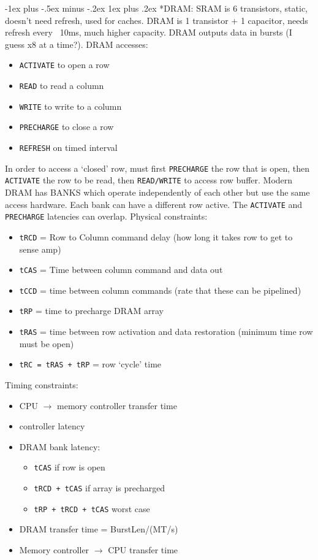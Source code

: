 \documentclass[landscape,10pt]{article}
\makeatletter
\renewcommand{\subsubsection}{\@startsection{subsubsection}{3}{0mm}%
            {-1ex plus -.5ex minus -.2ex}%
            {1ex plus .2ex}%
            {\normalfont\small\bfseries}}
\newcommand{\code}[1]{\texttt{#1}}
\makeatother
\begin{document}
\begin{multicols}{4}
\subsubsection*{DRAM:} SRAM is 6 transistors, static, doesn't need refresh, used for caches. DRAM is 1 transistor + 1 capacitor, needs refresh every ~10ms, much higher capacity. DRAM outputs data in bursts (I guess x8 at a time?). DRAM accesses:
\begin{itemize}
    \item[] \code{ACTIVATE} to open a row
    \item[] \code{READ} to read a column
    \item[] \code{WRITE} to write to a column
    \item[] \code{PRECHARGE} to close a row
    \item[] \code{REFRESH} on timed interval
\end{itemize}
In order to access a `closed' row, must first \code{PRECHARGE} the row that is open, then \code{ACTIVATE} the row to be read, then \code{READ/WRITE} to access row buffer. Modern DRAM has BANKS which operate independently of each other but use the same access hardware. Each bank can have a different row active. The \code{ACTIVATE} and \code{PRECHARGE} latencies can overlap. Physical constraints:
\begin{itemize}
    \item[] \code{tRCD} = Row to Column command delay (how long it takes row to get to sense amp)
    \item[] \code{tCAS} = Time between column command and data out
    \item[] \code{tCCD} = time between column commands (rate that these can be pipelined)
    \item[] \code{tRP} = time to precharge DRAM array
    \item[] \code{tRAS} = time between row activation and data restoration (minimum time row must be open)
    \item[] \code{tRC = tRAS + tRP} = row `cycle' time
\end{itemize}
Timing constraints:
\begin{itemize}
    \item[] CPU \(\rightarrow\) memory controller transfer time
    \item[] controller latency
    \item[] DRAM bank latency:
    \begin{itemize}
        \item[] \code{tCAS} if row is open
        \item[] \code{tRCD + tCAS} if array is precharged
        \item[] \code{tRP + tRCD + tCAS} worst case
    \end{itemize}
    \item[] DRAM transfer time = BurstLen/(MT/s)
    \item[] Memory controller \(\rightarrow\) CPU transfer time
\end{itemize}


\end{multicols}
\end{document}
